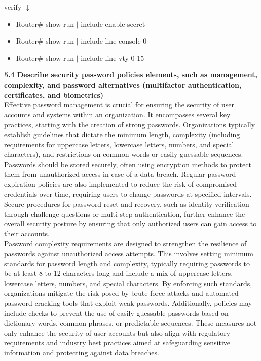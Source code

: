 \documentclass{article}
\begin{document}
verify $\downarrow$
\begin{itemize}
\item Router\# show run $\mid$ include enable secret
\item Router\# show run $\mid$ include line console 0
\item Router\# show run $\mid$ include line vty 0 15
\end{itemize}
  		
\textbf{5.4 Describe security password policies elements, such as management, complexity, and password alternatives (multifactor authentication, certificates, and biometrics)}\\

	Effective password management is crucial for ensuring the security of user accounts and systems within an organization. It encompasses several key practices, starting with the creation of strong passwords. Organizations typically establish guidelines that dictate the minimum length, complexity (including requirements for uppercase letters, lowercase letters, numbers, and special characters), and restrictions on common words or easily guessable sequences. Passwords should be stored securely, often using encryption methods to protect them from unauthorized access in case of a data breach. Regular password expiration policies are also implemented to reduce the risk of compromised credentials over time, requiring users to change passwords at specified intervals. Secure procedures for password reset and recovery, such as identity verification through challenge questions or multi-step authentication, further enhance the overall security posture by ensuring that only authorized users can gain access to their accounts.\\
	
	Password complexity requirements are designed to strengthen the resilience of passwords against unauthorized access attempts. This involves setting minimum standards for password length and complexity, typically requiring passwords to be at least 8 to 12 characters long and include a mix of uppercase letters, lowercase letters, numbers, and special characters. By enforcing such standards, organizations mitigate the risk posed by brute-force attacks and automated password cracking tools that exploit weak passwords. Additionally, policies may include checks to prevent the use of easily guessable passwords based on dictionary words, common phrases, or predictable sequences. These measures not only enhance the security of user accounts but also align with regulatory requirements and industry best practices aimed at safeguarding sensitive information and protecting against data breaches.\\
	
\end{document}
